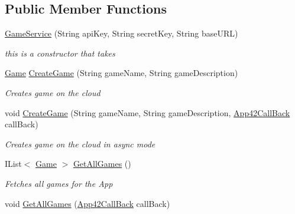 \subsection*{Public Member Functions}
\begin{DoxyCompactItemize}
\item 
\hyperlink{classcom_1_1shephertz_1_1app42_1_1paas_1_1sdk_1_1csharp_1_1game_1_1_game_service_a1ed871d5062e042663efeb24823fed3c}{Game\+Service} (String api\+Key, String secret\+Key, String base\+U\+R\+L)
\begin{DoxyCompactList}\small\item\em this is a constructor that takes \end{DoxyCompactList}\item 
\hyperlink{classcom_1_1shephertz_1_1app42_1_1paas_1_1sdk_1_1csharp_1_1game_1_1_game}{Game} \hyperlink{classcom_1_1shephertz_1_1app42_1_1paas_1_1sdk_1_1csharp_1_1game_1_1_game_service_ae3a6a649bd570bedd152c2dc3fa19f2f}{Create\+Game} (String game\+Name, String game\+Description)
\begin{DoxyCompactList}\small\item\em Creates game on the cloud \end{DoxyCompactList}\item 
void \hyperlink{classcom_1_1shephertz_1_1app42_1_1paas_1_1sdk_1_1csharp_1_1game_1_1_game_service_a8b17b42126b6e8927a0c377667142bc1}{Create\+Game} (String game\+Name, String game\+Description, \hyperlink{interfacecom_1_1shephertz_1_1app42_1_1paas_1_1sdk_1_1csharp_1_1_app42_call_back}{App42\+Call\+Back} call\+Back)
\begin{DoxyCompactList}\small\item\em Creates game on the cloud in async mode \end{DoxyCompactList}\item 
I\+List$<$ \hyperlink{classcom_1_1shephertz_1_1app42_1_1paas_1_1sdk_1_1csharp_1_1game_1_1_game}{Game} $>$ \hyperlink{classcom_1_1shephertz_1_1app42_1_1paas_1_1sdk_1_1csharp_1_1game_1_1_game_service_a44ff8bfd752812bcb22d07797b0776aa}{Get\+All\+Games} ()
\begin{DoxyCompactList}\small\item\em Fetches all games for the App \end{DoxyCompactList}\item 
void \hyperlink{classcom_1_1shephertz_1_1app42_1_1paas_1_1sdk_1_1csharp_1_1game_1_1_game_service_a3e8d721ec3063222d2afa03d99469d23}{Get\+All\+Games} (\hyperlink{interfacecom_1_1shephertz_1_1app42_1_1paas_1_1sdk_1_1csharp_1_1_app42_call_back}{App42\+Call\+Back} call\+Back)

\end{DoxyCompactItemize}

